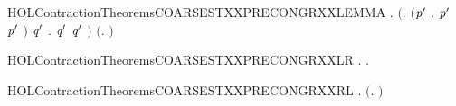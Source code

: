 \newcommand{\HOLContractionTheoremsCOARSESTXXPRECONGRXXFINITEYY}{\UseVerbatim{HOLContractionTheoremsCOARSESTXXPRECONGRXXFINITEYY}}
\begin{SaveVerbatim}{HOLContractionTheoremsCOARSESTXXPRECONGRXXLEMMA}
\HOLTokenTurnstile{} \HOLSymConst{\HOLTokenForall{}} .
     \ensuremath{(}\HOLSymConst{\HOLTokenExists{}}.   \HOLSymConst{\HOLTokenConj{}} \ensuremath{(}\HOLSymConst{\HOLTokenForall{}}\ensuremath{\HOLBoundVar{p}\sp{\prime{}}} .  \HOLTokenWeakTransBegin{}\HOLTokenWeakTransEnd \ensuremath{\HOLBoundVar{p}\sp{\prime{}}} \HOLSymConst{\HOLTokenImp{}} \HOLSymConst{\HOLTokenNeg{}} \ensuremath{\HOLBoundVar{p}\sp{\prime{}}} \ensuremath{)} \HOLSymConst{\HOLTokenConj{}}
          \HOLSymConst{\HOLTokenForall{}}\ensuremath{\HOLBoundVar{q}\sp{\prime{}}} .  \HOLTokenWeakTransBegin{}\HOLTokenWeakTransEnd \ensuremath{\HOLBoundVar{q}\sp{\prime{}}} \HOLSymConst{\HOLTokenImp{}} \HOLSymConst{\HOLTokenNeg{}} \ensuremath{\HOLBoundVar{q}\sp{\prime{}}} \ensuremath{)} \HOLSymConst{\HOLTokenImp{}}
     \ensuremath{(}\HOLSymConst{\HOLTokenForall{}}.  \HOLSymConst{\ensuremath{+}}    \HOLSymConst{\ensuremath{+}} \ensuremath{)} \HOLSymConst{\HOLTokenImp{}}
       
\end{SaveVerbatim}
\newcommand{\HOLContractionTheoremsCOARSESTXXPRECONGRXXLEMMA}{\UseVerbatim{HOLContractionTheoremsCOARSESTXXPRECONGRXXLEMMA}}
\begin{SaveVerbatim}{HOLContractionTheoremsCOARSESTXXPRECONGRXXLR}
\HOLTokenTurnstile{} \HOLSymConst{\HOLTokenForall{}} .    \HOLSymConst{\HOLTokenImp{}} \HOLSymConst{\HOLTokenForall{}}.  \HOLSymConst{\ensuremath{+}}    \HOLSymConst{\ensuremath{+}} 
\end{SaveVerbatim}
\newcommand{\HOLContractionTheoremsCOARSESTXXPRECONGRXXLR}{\UseVerbatim{HOLContractionTheoremsCOARSESTXXPRECONGRXXLR}}
\begin{SaveVerbatim}{HOLContractionTheoremsCOARSESTXXPRECONGRXXRL}
\HOLTokenTurnstile{} \HOLSymConst{\HOLTokenForall{}} .
       \HOLSymConst{\HOLTokenConj{}}   \HOLSymConst{\HOLTokenImp{}}
     \ensuremath{(}\HOLSymConst{\HOLTokenForall{}}.  \HOLSymConst{\ensuremath{+}}    \HOLSymConst{\ensuremath{+}} \ensuremath{)} \HOLSymConst{\HOLTokenImp{}}
       
\end{SaveVerbatim}
